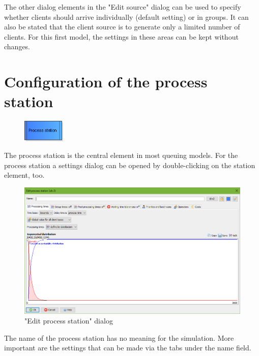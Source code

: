 \documentclass{svmono}
\begin{document}
The other dialog elements in the "Edit source" dialog can be used to specify whether clients should arrive individually (default setting) or in groups. It can also be stated that the client source is to generate only a limited number of clients. For this first model, the settings in these areas can be kept without changes.

\section{Configuration of the process station}

\begin{figure}
\vspace{-22pt}
\includegraphics[width=2cm]{IconProcess.png}
\vspace{-22pt}
\end{figure}
The process station is the central element in most queuing models. For the process station a settings dialog can be opened by double-clicking on the station element, too.

\begin{figure}[H]	
	\caption{"Edit process station" dialog}
	\centerline{\includegraphics[width=14cm]{DialogProcess.png}}
	\label{fig:DialogProcess}
\end{figure}
 
The name of the process station has no meaning for the simulation. More important are the settings that can be made via the tabs under the name field.
\end{document}
